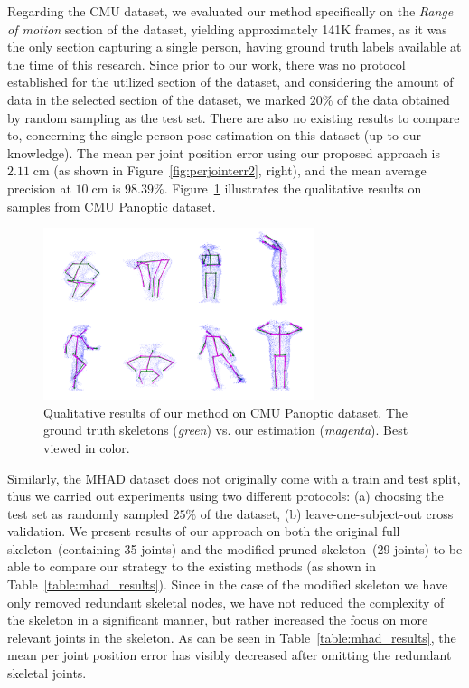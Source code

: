 \noindent
Regarding the CMU dataset, we evaluated our method specifically on the \textit{Range of motion} section of the dataset, yielding approximately 141K frames, as it was the only section capturing a single person, having ground truth labels available at the time of this research. Since prior to our work, there was no protocol established for the utilized section of the dataset, and considering the amount of data in the selected section of the dataset, we marked $20 \%$ of the data obtained by random sampling as the test set. There are also no existing results to compare to, concerning the single person pose estimation on this dataset (up to our knowledge). The mean per joint position error using our proposed approach is $2.11 \; \mbox{cm}$ (as shown in Figure~\ref{fig:perjointerr2}, right), and the mean average precision at $10 \; \mbox{cm}$ is  $98.39\%$. Figure~\ref{fig:cmu_results} illustrates the qualitative results on samples from CMU Panoptic dataset.\par
\vspace{5mm}

\begin{figure}[H]
\begin{center}
\includegraphics[height=190px]{images/results/CMU_results.png}
\caption[Qualitative results of our method on CMU Panoptic dataset.]{Qualitative results of our method on CMU Panoptic dataset. The ground truth skeletons ({\it green}) vs. our estimation ({\it magenta}). Best viewed in color.}
\label{fig:cmu_results}
\end{center}
\end{figure}

\noindent
Similarly, the MHAD dataset does not originally come with a train and test split, thus we carried out experiments using two different protocols: (a) choosing the test set as randomly sampled $25 \%$ of the dataset, (b) leave-one-subject-out cross validation. We present results of our approach on both the original full skeleton~(containing 35 joints) and the modified pruned skeleton~(29 joints) to be able to compare our strategy to the existing methods (as shown in Table~\ref{table:mhad_results}). Since in the case of the modified skeleton we have only removed redundant skeletal nodes, we have not reduced the complexity of the skeleton in a significant manner, but rather increased the focus on more relevant joints in the skeleton. As can be seen in Table~\ref{table:mhad_results}, the mean per joint position error has visibly decreased after omitting the redundant skeletal joints.\par
\vspace{5mm}

